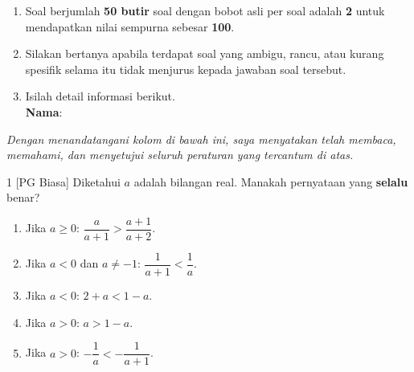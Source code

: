 \documentclass[11pt]{article}
\newenvironment{pil}{%
  \begin{enumerate}[label=(\alph*),leftmargin=*,itemsep=1pt,topsep=3pt]}%
  {\end{enumerate}}
\begin{document}
\begin{enumerate}[leftmargin=*,itemsep=4pt,topsep=4pt]
  \item Soal berjumlah \textbf{50 butir} soal dengan bobot asli per soal adalah
        \textbf{2} untuk mendapatkan nilai sempurna sebesar \textbf{100}.

  \item Silakan bertanya apabila terdapat soal yang ambigu, rancu, atau kurang
        spesifik selama itu tidak menjurus kepada jawaban soal tersebut.

  \item Isilah detail informasi berikut.\\[0.3em]
        \textbf{Nama}\hspace{0.45cm}:\enspace\underline{\hspace{8cm}}
\end{enumerate}

\vspace{0.6cm}
\noindent\textit{Dengan menandatangani kolom di bawah ini, saya menyatakan telah membaca,
memahami, dan menyetujui seluruh peraturan yang tercantum di atas.}

\vspace{0.6cm}
\noindent{}

\clearpage


\begin{soal}{1 \normalfont\small[PG Biasa]}
Diketahui $a$ adalah bilangan real. Manakah pernyataan yang \textbf{selalu} benar?
\begin{pil}
  \item Jika $a\geq0$: $\dfrac{a}{a+1}>\dfrac{a+1}{a+2}$.
  \item Jika $a<0$ dan $a\neq-1$: $\dfrac{1}{a+1}<\dfrac{1}{a}$.
  \item Jika $a<0$: $2+a<1-a$.
  \item Jika $a>0$: $a>1-a$.
  \item Jika $a>0$: $-\dfrac{1}{a}<-\dfrac{1}{a+1}$.
\end{pil}
\end{soal}
\end{document}
